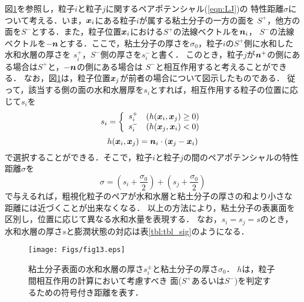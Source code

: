 図\ref{fig:fig13}を参照し，粒子$i$と粒子$j$に関するペアポテンシャル(\ref{eqn:LJ})の
特性距離$\sigma$について考える．いま，$\mbox{\boldmath $x$}_i$にある粒子$i$が属する粘土分子の一方の面を
$S^+$，他方の面を$S^-$とする．また，粒子位置$\mbox{\boldmath $x$}_i$における$S^+$の法線ベクトルを$\mbox{\boldmath $n$}_i$，
$S^-$の法線ベクトルを$-\mbox{\boldmath $n$}$とする．ここで，粘土分子の厚さを$\sigma_0$，粒子$i$の$S^+$側に水和した水和水層の厚さを
$s_i^+$，$S^-$側の厚さを$s_i^-$と書く．
このとき，粒子$j$が$\mbox{\boldmath $n$}^+$の側にある場合は$S^+$と，$-\mbox{\boldmath $n$}$の側にある場合は
$S^-$と相互作用すると考えることができる．
なお，図\ref{fig:fig13}は，粒子位置$\mbox{\boldmath $x$}_j$が前者の場合について図示したものである．
従って，該当する側の面の水和水層厚を$s_i$とすれば，相互作用する粒子の位置に応じて$s_i$を
\begin{equation}
	s_i=\left\{
	\begin{array}{cc}
		s_i^+ & (h(\mbox{\boldmath $x$}_i,\mbox{\boldmath $x$}_j) \ge 0)\\
		s_i^- & (h(\mbox{\boldmath $x$}_j,\mbox{\boldmath $x$}_i) <0)
	\end{array}
	\right.
	\label{eqn:si_switch}
\end{equation}
\begin{equation}
	h(\mbox{\boldmath $x$}_i,\mbox{\boldmath $x$}_j) =\mbox{\boldmath $n$}_i\cdot \left(\mbox{\boldmath $x$}_j-\mbox{\boldmath $x$}_i\right)
	\label{eqn:h_sgn}
\end{equation}
で選択することができる．そこで，粒子$i$と粒子$j$の間のペアポテンシャルの特性距離$\sigma$を
\begin{equation}
	\sigma=\left(s_i+\frac{\sigma_0}{2}\right)+ \left( s_j+\frac{\sigma_0}{2} \right)
	\label{eqn:sig_ij}
\end{equation}
で与えるれば，粗視化粒子のペアが水和水層と粘土分子の厚さの和より小さな
距離には近づくことが出来なくなる．
以上の方法により，粘土分子の表裏面を区別し，位置に応じて異なる水和水量を表現する．
なお，$s_i=s_j=s$のとき，水和水層の厚さ$s$と膨潤状態の対応は表\ref{tbl:tbl_sig}のようになる．
\begin{figure}[h]
	\begin{center}
	\texttt{[image: Figs/fig13.eps]} 
	\end{center}
	\caption{
		粘土分子表面の水和水層の厚さ$s_i^\pm $と粘土分子の厚さ$\sigma_0$．
		$h$は，粒子間相互作用の計算において考慮すべき
		面($S^+$あるいは$S^-$)を判定するための符号付き距離を表す．
	} 
	\label{fig:fig13}
\end{figure}
